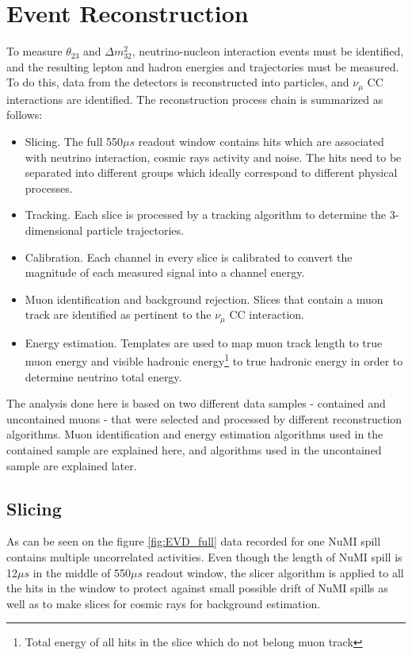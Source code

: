\chapter{Event Reconstruction}
\label{reconstruction_chapter}

To measure $\theta_{23}$ and $\Delta m_{32}^2$, neutrino-nucleon interaction events must be identified, and the
resulting lepton and hadron energies and trajectories must be measured. To do this, data from the
detectors is reconstructed into particles, and $\nu_\mu$ CC interactions are identified. The
reconstruction process chain is summarized as follows:
\begin{itemize}
\item Slicing. The full 550$\mu s$ readout window contains hits which are associated with
neutrino interaction, cosmic rays activity and noise. The hits need to be separated into
different groups which ideally correspond to different physical processes.
\item Tracking.  Each slice is processed by a tracking algorithm to determine the 3-dimensional particle
trajectories.
\item Calibration. Each channel in every slice is calibrated to convert the magnitude of each
measured signal into a channel energy.
\item Muon identification and background rejection. Slices that contain a muon track are identified
as pertinent to the $\nu_\mu$ CC interaction.
\item Energy estimation. Templates are used to map muon track length to true muon energy and visible 
hadronic energy\footnote{Total energy of all hits in the slice which do not belong muon track} to true 
hadronic energy in order to determine neutrino total energy.  
\end{itemize}
The analysis done here is based on two different data samples - contained and uncontained muons -
that were selected and processed by different reconstruction algorithms. Muon identification and energy
estimation algorithms used in the contained sample are explained here, and algorithms used in the uncontained
sample are explained later.

\section{Slicing}
As can be seen on the figure \ref{fig:EVD_full} data recorded for one NuMI spill contains
multiple uncorrelated activities. Even though the length of NuMI spill is 12$\mu s$ in the middle
of 550$\mu s$ readout window, the slicer algorithm is applied to all the hits in the window to protect 
against small possible drift of NuMI spills as well as to make slices for cosmic rays for background
estimation.

